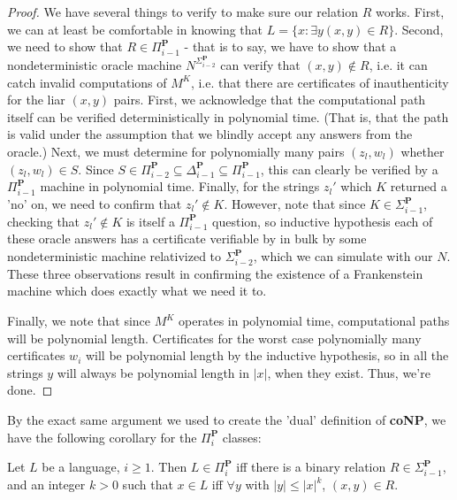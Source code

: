 \begin{proof}
    \par We have several things to verify to make sure our relation $R$ works. First, we can at least be comfortable in knowing that $L = \{x: \exists y (x,y) \in R \}$. Second, we need to show that $R \in \Pi_{i-1}^{\textbf{P}}$ - that is to say, we have to show that a nondeterministic oracle machine $N^{\Sigma_{i-2}^{\textbf{P}}}$ can verify that $(x,y) \notin R$, i.e. it can catch invalid computations of $M^K$, i.e. that there are certificates of inauthenticity for the liar $(x,y)$ pairs. First, we acknowledge that the computational path itself can be verified deterministically in polynomial time. (That is, that the path is valid under the assumption that we blindly accept any answers from the oracle.) Next, we must determine for polynomially many pairs $(z_l,w_l)$ whether $(z_l,w_l) \in S$. Since $S \in \Pi_{i-2}^{\textbf{P}} \subseteq \Delta_{i-1}^{\textbf{P}} \subseteq \Pi_{i-1}^{\textbf{P}}$, this can clearly be verified by a $\Pi_{i-1}^{\textbf{P}}$ machine in polynomial time. Finally, for the strings $z_l'$ which $K$ returned a 'no' on, we need to confirm that $z_l' \notin K$. However, note that since $K \in \Sigma_{i-1}^{\textbf{P}}$, checking that $z_l' \notin K$ is itself a $\Pi_{i-1}^{\textbf{P}}$ question, so inductive hypothesis each of these oracle answers has a certificate verifiable by in bulk by some nondeterministic machine relativized to $\Sigma_{i-2}^{\textbf{P}}$, which we can simulate with our $N$. These three observations result in confirming the existence of a Frankenstein machine which does exactly what we need it to.
    \par Finally, we note that since $M^K$ operates in polynomial time, computational paths will be polynomial length. Certificates for the worst case polynomially many certificates $w_i$ will be polynomial length by the inductive hypothesis, so in all the strings $y$ will always be polynomial length in $|x|$, when they exist. Thus, we're done.
\end{proof}
By the exact same argument we used to create the 'dual' definition of \textbf{coNP}, we have the following corollary for the $\Pi_i^{\textbf{P}}$ classes:
\begin{corollary}
    Let $L$ be a language, $i \geq 1$. Then $L \in \Pi_i^{\textbf{P}}$ iff there is a binary relation $R \in \Sigma_{i-1}^{\textbf{P}}$, and an integer $k>0$ such that $x \in L$ iff $\forall y$ with $|y| \leq |x|^k$, $(x,y) \in R$. 
\end{corollary}
